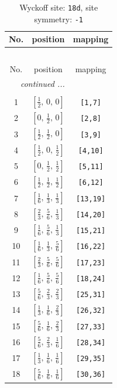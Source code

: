 \documentclass[fleqn,8pt]{jsarticle}
\begin{document}
\begin{longtable}{ccc}
\caption{Wyckoff site: {\tt 18d}, site symmetry: {\tt -1}}
 \\
 \hline \hline
No. & position & mapping \\ \hline \endfirsthead

\multicolumn{2}{l}{\tablename\ \thetable{}} \\
 \hline \hline
No. & position & mapping \\ \hline \endhead

 \hline \hline
\multicolumn{2}{r}{\footnotesize\it continued ...} \\ \endfoot

 \hline \hline
\multicolumn{2}{r}{} \\ \endlastfoot

1 & $\left[ \frac{1}{2},\, 0,\, 0 \right]$ & {\tt [1,7]} \\ \hline
2 & $\left[ 0,\, \frac{1}{2},\, 0 \right]$ & {\tt [2,8]} \\ \hline
3 & $\left[ \frac{1}{2},\, \frac{1}{2},\, 0 \right]$ & {\tt [3,9]} \\ \hline
4 & $\left[ \frac{1}{2},\, 0,\, \frac{1}{2} \right]$ & {\tt [4,10]} \\ \hline
5 & $\left[ 0,\, \frac{1}{2},\, \frac{1}{2} \right]$ & {\tt [5,11]} \\ \hline
6 & $\left[ \frac{1}{2},\, \frac{1}{2},\, \frac{1}{2} \right]$ & {\tt [6,12]} \\ \hline
7 & $\left[ \frac{1}{6},\, \frac{1}{3},\, \frac{1}{3} \right]$ & {\tt [13,19]} \\ \hline
8 & $\left[ \frac{2}{3},\, \frac{5}{6},\, \frac{1}{3} \right]$ & {\tt [14,20]} \\ \hline
9 & $\left[ \frac{1}{6},\, \frac{5}{6},\, \frac{1}{3} \right]$ & {\tt [15,21]} \\ \hline
10 & $\left[ \frac{1}{6},\, \frac{1}{3},\, \frac{5}{6} \right]$ & {\tt [16,22]} \\ \hline
11 & $\left[ \frac{2}{3},\, \frac{5}{6},\, \frac{5}{6} \right]$ & {\tt [17,23]} \\ \hline
12 & $\left[ \frac{1}{6},\, \frac{5}{6},\, \frac{5}{6} \right]$ & {\tt [18,24]} \\ \hline
13 & $\left[ \frac{5}{6},\, \frac{2}{3},\, \frac{2}{3} \right]$ & {\tt [25,31]} \\ \hline
14 & $\left[ \frac{1}{3},\, \frac{1}{6},\, \frac{2}{3} \right]$ & {\tt [26,32]} \\ \hline
15 & $\left[ \frac{5}{6},\, \frac{1}{6},\, \frac{2}{3} \right]$ & {\tt [27,33]} \\ \hline
16 & $\left[ \frac{5}{6},\, \frac{2}{3},\, \frac{1}{6} \right]$ & {\tt [28,34]} \\ \hline
17 & $\left[ \frac{1}{3},\, \frac{1}{6},\, \frac{1}{6} \right]$ & {\tt [29,35]} \\ \hline
18 & $\left[ \frac{5}{6},\, \frac{1}{6},\, \frac{1}{6} \right]$ & {\tt [30,36]} \\
\end{longtable}
\end{document}
